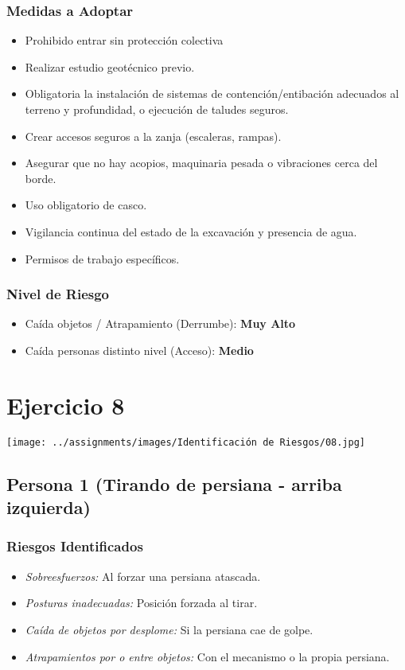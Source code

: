 \documentclass[12pt,a4paper]{article}
\begin{document}
	\subsubsection{Medidas a Adoptar}
	\begin{itemize}
		\item Prohibido entrar sin protección colectiva
		\item Realizar estudio geotécnico previo.
		\item Obligatoria la instalación de sistemas de contención/entibación adecuados al terreno y profundidad, o ejecución de taludes seguros.
		\item Crear accesos seguros a la zanja (escaleras, rampas).
		\item Asegurar que no hay acopios, maquinaria pesada o vibraciones cerca del borde.
		\item Uso obligatorio de casco.
		\item Vigilancia continua del estado de la excavación y presencia de agua.
		\item Permisos de trabajo específicos.
	\end{itemize}
	
	\subsubsection{Nivel de Riesgo}
	\begin{itemize}
		\item Caída objetos / Atrapamiento (Derrumbe): \textbf{Muy Alto}
		\item Caída personas distinto nivel (Acceso): \textbf{Medio}
	\end{itemize}

	
	\section{Ejercicio 8}
	
	\texttt{[image: ../assignments/images/Identificación de Riesgos/08.jpg]}
	
	\subsection{Persona 1 (Tirando de persiana - arriba izquierda)}
	
	\subsubsection{Riesgos Identificados}
	\begin{itemize}
		\item \textit{Sobreesfuerzos:} Al forzar una persiana atascada.
		\item \textit{Posturas inadecuadas:} Posición forzada al tirar.
		\item \textit{Caída de objetos por desplome:} Si la persiana cae de golpe.
		\item \textit{Atrapamientos por o entre objetos:} Con el mecanismo o la propia persiana.
	\end{itemize}
	
\end{document}
